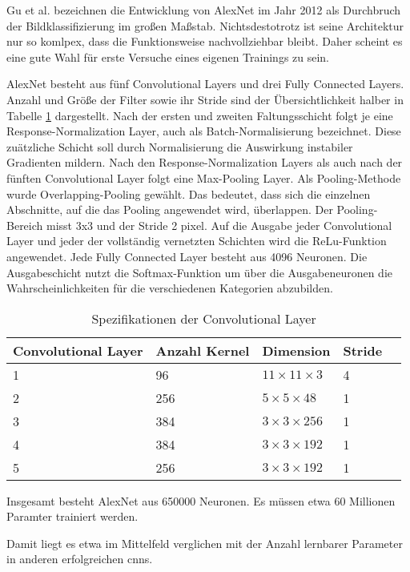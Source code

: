Gu et al. \cite{Gu:2018} bezeichnen die Entwicklung von AlexNet im Jahr 2012 als Durchbruch der Bildklassifizierung im großen Maßstab. 
Nichtsdestotrotz ist seine Architektur nur so komlpex, dass die Funktionsweise nachvollziehbar bleibt. Daher scheint es eine gute Wahl für erste Versuche eines eigenen Trainings zu sein.


AlexNet besteht aus fünf Convolutional Layers und drei Fully Connected Layers. Anzahl und Größe der Filter sowie ihr Stride sind 
der Übersichtlichkeit halber in Tabelle \ref{ConvAlex} dargestellt.
Nach der ersten und zweiten Faltungsschicht folgt je eine Response-Normalization Layer, auch als Batch-Normalisierung bezeichnet. 
Diese zuätzliche Schicht soll durch Normalisierung die Auswirkung instabiler Gradienten mildern.
Nach den Response-Normalization Layers als auch nach der fünften Convolutional Layer folgt eine Max-Pooling Layer. 
Als Pooling-Methode wurde Overlapping-Pooling gewählt. Das bedeutet, dass sich die einzelnen Abschnitte, auf die das Pooling angewendet wird, 
überlappen. Der Pooling-Bereich misst 3x3 und der Stride 2 pixel.
Auf die Ausgabe jeder Convolutional Layer und jeder der vollständig vernetzten Schichten wird die ReLu-Funktion angewendet.
Jede Fully Connected Layer besteht aus 4096 Neuronen. Die Ausgabeschicht nutzt die Softmax-Funktion um über die Ausgabeneuronen die 
Wahrscheinlichkeiten für die verschiedenen Kategorien abzubilden. \cite{Krizhevsky:2012}\cite{Alake:2020}

\begin{table} [H]
\centering
	\begin{tabular} {l l l l l}
Convolutional Layer & Anzahl Kernel & Dimension & Stride \\ \hline
1 & 96 & $11\times11\times3$ & 4\\
2 & 256 & $5\times5\times48$ & 1\\
3 & 384 & $3\times3\times256$ & 1\\
4 & 384 & $3\times3\times192$ & 1\\
5 & 256 & $3\times3\times192$ & 1\\
\end{tabular}
\caption{Spezifikationen der Convolutional Layer}
\label{ConvAlex}
\end{table}

Insgesamt besteht AlexNet aus 650000 Neuronen. Es müssen etwa 60 Millionen Paramter trainiert werden. \cite{Krizhevsky:2012}

Damit liegt es etwa im Mittelfeld verglichen mit der Anzahl lernbarer Parameter in anderen erfolgreichen \ac{cnn}s.


